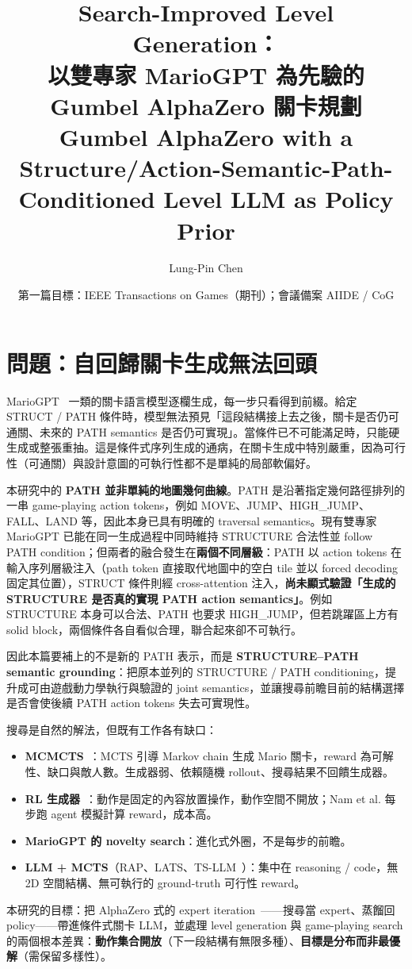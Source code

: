 \documentclass[11pt,a4paper]{article}
\title{\vspace{-1.2cm}Search-Improved Level Generation：\\以雙專家 MarioGPT 為先驗的 Gumbel AlphaZero 關卡規劃\\
\large Gumbel AlphaZero with a Structure/Action-Semantic-Path-Conditioned Level LLM as Policy Prior}
\author{Lung-Pin Chen}
\date{第一篇\quad 目標：IEEE Transactions on Games（期刊）；會議備案 AIIDE / CoG}
\begin{document}
\maketitle
\vspace{-0.6cm}

\section{問題：自回歸關卡生成無法回頭}
MarioGPT~\cite{sudhakaran2023} 一類的關卡語言模型逐欄生成，每一步只看得到前綴。給定 STRUCT / PATH 條件時，模型無法預見「這段結構接上去之後，關卡是否仍可通關、未來的 PATH semantics 是否仍可實現」。當條件已不可能滿足時，只能硬生成或整張重抽。這是條件式序列生成的通病，在關卡生成中特別嚴重，因為可行性（可通關）與設計意圖的可執行性都不是單純的局部軟偏好。

本研究中的 \textbf{PATH 並非單純的地圖幾何曲線}。PATH 是沿著指定幾何路徑排列的一串 game-playing action tokens，例如 MOVE、JUMP、HIGH\_JUMP、FALL、LAND 等，因此本身已具有明確的 traversal semantics。現有雙專家 MarioGPT 已能在同一生成過程中同時維持 STRUCTURE 合法性並 follow PATH condition；但兩者的融合發生在\textbf{兩個不同層級}：PATH 以 action tokens 在輸入序列層級注入（path token 直接取代地圖中的空白 tile 並以 forced decoding 固定其位置），STRUCT 條件則經 cross-attention 注入，\textbf{尚未顯式驗證「生成的 STRUCTURE 是否真的實現 PATH action semantics」}。例如 STRUCTURE 本身可以合法、PATH 也要求 HIGH\_JUMP，但若跳躍區上方有 solid block，兩個條件各自看似合理，聯合起來卻不可執行。

因此本篇要補上的不是新的 PATH 表示，而是 \textbf{STRUCTURE--PATH semantic grounding}：把原本並列的 STRUCTURE / PATH conditioning，提升成可由遊戲動力學執行與驗證的 joint semantics，並讓搜尋前瞻目前的結構選擇是否會使後續 PATH action tokens 失去可實現性。

搜尋是自然的解法，但既有工作各有缺口：
\begin{itemize}
\item \textbf{MCMCTS}~\cite{summerville2015}：MCTS 引導 Markov chain 生成 Mario 關卡，reward 為可解性、缺口與敵人數。生成器弱、依賴隨機 rollout、搜尋結果不回饋生成器。
\item \textbf{RL 生成器}~\cite{khalifa2020,nam2024}：動作是固定的內容放置操作，動作空間不開放；Nam et al. 每步跑 agent 模擬計算 reward，成本高。
\item \textbf{MarioGPT 的 novelty search}：進化式外圈，不是每步的前瞻。
\item \textbf{LLM + MCTS}（RAP、LATS、TS-LLM~\cite{feng2023}）：集中在 reasoning / code，無 2D 空間結構、無可執行的 ground-truth 可行性 reward。
\end{itemize}
本研究的目標：把 AlphaZero 式的 expert iteration~\cite{anthony2017,silver2018}——搜尋當 expert、蒸餾回 policy——帶進條件式關卡 LLM，並處理 level generation 與 game-playing search 的兩個根本差異：\textbf{動作集合開放}（下一段結構有無限多種）、\textbf{目標是分布而非最優解}（需保留多樣性）。
\end{document}
